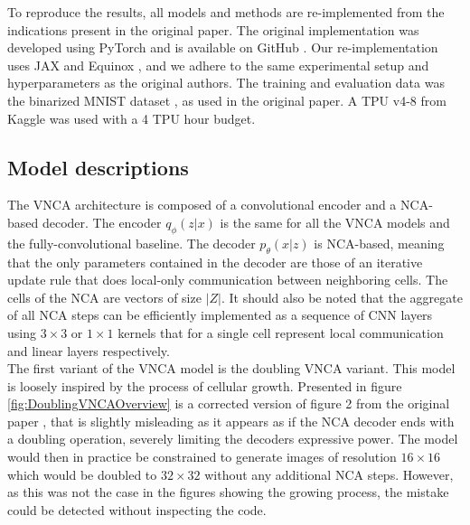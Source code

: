 To reproduce the results, all models and methods are re-implemented from the indications present in the original paper. The original implementation was developed using PyTorch and is available on GitHub \cite{vnca}. Our re-implementation uses JAX \cite{jax2018github} and Equinox \cite{kidger2021equinox}, and we adhere to the same experimental setup and hyperparameters as the original authors. The training and evaluation data was the binarized MNIST dataset \cite{binarizedMNIST}, as used in the original paper. A TPU v4-8 from Kaggle was used with a 4 TPU hour budget.

\subsection{Model descriptions}


The VNCA architecture is composed of a convolutional encoder and a NCA-based decoder. The encoder $q_\phi(z|x)$ is the same for all the VNCA models and the fully-convolutional baseline. The decoder $p_\theta(x|z)$ is NCA-based, meaning that the only parameters contained in the decoder are those of an iterative update rule that does local-only communication between neighboring cells. The cells of the NCA are vectors of size $|Z|$. It should also be noted that the aggregate of all NCA steps can be efficiently implemented as a sequence of CNN layers using $3\times3$ or $1\times1$ kernels that for a single cell represent local communication and linear layers respectively. 
\\

The first variant of the VNCA model is the doubling VNCA variant. This model is loosely inspired by the process of cellular growth. Presented in figure \ref{fig:DoublingVNCAOverview} is a corrected version of figure 2 from the original paper \cite{palm2022variational}, that is slightly misleading as it appears as if the NCA decoder ends with a doubling operation, severely limiting the decoders expressive power. The model would then in practice be constrained to generate images of resolution $16 \times 16$ which would be doubled to $32 \times 32$ without any additional NCA steps. However, as this was not the case in the figures showing the growing process, the mistake could be detected without inspecting the code.\\\\


